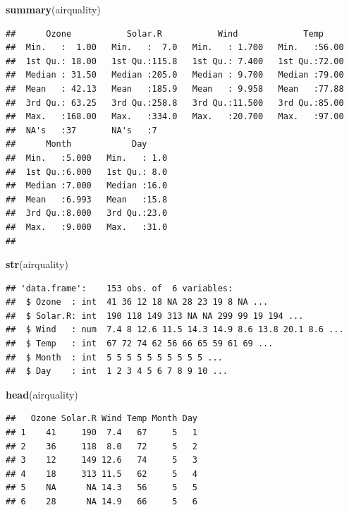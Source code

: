 \documentclass[]{book}
\newenvironment{Shaded}{\begin{snugshade}}{\end{snugshade}}
\newcommand{\KeywordTok}[1]{\textcolor[rgb]{0.13,0.29,0.53}{\textbf{#1}}}
\newcommand{\NormalTok}[1]{#1}
\theoremstyle{definition}
\theoremstyle{definition}
\theoremstyle{definition}
\theoremstyle{remark}
\begin{document}
\begin{Shaded}
\begin{Highlighting}[]
\KeywordTok{summary}\NormalTok{(airquality)}
\end{Highlighting}
\end{Shaded}

\begin{verbatim}
##      Ozone           Solar.R           Wind             Temp      
##  Min.   :  1.00   Min.   :  7.0   Min.   : 1.700   Min.   :56.00  
##  1st Qu.: 18.00   1st Qu.:115.8   1st Qu.: 7.400   1st Qu.:72.00  
##  Median : 31.50   Median :205.0   Median : 9.700   Median :79.00  
##  Mean   : 42.13   Mean   :185.9   Mean   : 9.958   Mean   :77.88  
##  3rd Qu.: 63.25   3rd Qu.:258.8   3rd Qu.:11.500   3rd Qu.:85.00  
##  Max.   :168.00   Max.   :334.0   Max.   :20.700   Max.   :97.00  
##  NA's   :37       NA's   :7                                       
##      Month            Day      
##  Min.   :5.000   Min.   : 1.0  
##  1st Qu.:6.000   1st Qu.: 8.0  
##  Median :7.000   Median :16.0  
##  Mean   :6.993   Mean   :15.8  
##  3rd Qu.:8.000   3rd Qu.:23.0  
##  Max.   :9.000   Max.   :31.0  
## 
\end{verbatim}

\begin{Shaded}
\begin{Highlighting}[]
\KeywordTok{str}\NormalTok{(airquality)}
\end{Highlighting}
\end{Shaded}

\begin{verbatim}
## 'data.frame':    153 obs. of  6 variables:
##  $ Ozone  : int  41 36 12 18 NA 28 23 19 8 NA ...
##  $ Solar.R: int  190 118 149 313 NA NA 299 99 19 194 ...
##  $ Wind   : num  7.4 8 12.6 11.5 14.3 14.9 8.6 13.8 20.1 8.6 ...
##  $ Temp   : int  67 72 74 62 56 66 65 59 61 69 ...
##  $ Month  : int  5 5 5 5 5 5 5 5 5 5 ...
##  $ Day    : int  1 2 3 4 5 6 7 8 9 10 ...
\end{verbatim}

\begin{Shaded}
\begin{Highlighting}[]
\KeywordTok{head}\NormalTok{(airquality)}
\end{Highlighting}
\end{Shaded}

\begin{verbatim}
##   Ozone Solar.R Wind Temp Month Day
## 1    41     190  7.4   67     5   1
## 2    36     118  8.0   72     5   2
## 3    12     149 12.6   74     5   3
## 4    18     313 11.5   62     5   4
## 5    NA      NA 14.3   56     5   5
## 6    28      NA 14.9   66     5   6
\end{verbatim}
\end{document}

